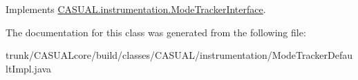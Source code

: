 Implements \hyperlink{interface_c_a_s_u_a_l_1_1instrumentation_1_1_mode_tracker_interface_a3f4a0e410a7650e257fe9150f08343b2}{C\-A\-S\-U\-A\-L.\-instrumentation.\-Mode\-Tracker\-Interface}.



The documentation for this class was generated from the following file\-:\begin{DoxyCompactItemize}
\item 
trunk/\-C\-A\-S\-U\-A\-Lcore/build/classes/\-C\-A\-S\-U\-A\-L/instrumentation/Mode\-Tracker\-Default\-Impl.\-java\end{DoxyCompactItemize}
